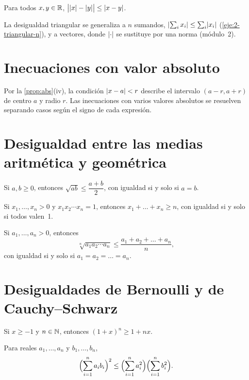 \begin{corolario}\label{cor:triangular-inversa}
Para todos $x,y\in\mathbb{R}$, $\bigl|\lvert x\rvert-\lvert y\rvert\bigr|\le\lvert x-y\rvert$.
\end{corolario}

La desigualdad triangular se generaliza a $n$ sumandos, $\lvert\sum_i x_i\rvert\le\sum_i\lvert x_i\rvert$ (\cref{eje:2-triangular-n}), y a vectores, donde $\lvert\cdot\rvert$ se sustituye por una norma (módulo~2).

\section{Inecuaciones con valor absoluto}

Por la \cref{prop:abs}(iv), la condición $\lvert x-a\rvert<r$ describe el intervalo $(a-r,a+r)$ de centro $a$ y radio $r$. Las inecuaciones con varios valores absolutos se resuelven separando casos según el signo de cada expresión.

\addtocounter{definicion}{1}%

\section{Desigualdad entre las medias aritmética y geométrica}

\begin{proposicion}\label{prop:amgm2}
Si $a,b\ge0$, entonces $\sqrt{ab}\le\dfrac{a+b}{2}$, con igualdad si y solo si $a=b$.
\end{proposicion}

\begin{lema}\label{lem:producto1}
Si $x_1,\dots,x_n>0$ y $x_1x_2\cdots x_n=1$, entonces $x_1+\dots+x_n\ge n$, con igualdad si y solo si todos valen~1.
\end{lema}

\begin{teorema}\label{teo:amgm}
Si $a_1,\dots,a_n>0$, entonces
\[
\sqrt[n]{a_1a_2\cdots a_n}\le\frac{a_1+a_2+\dots+a_n}{n},
\]
con igualdad si y solo si $a_1=a_2=\dots=a_n$.
\end{teorema}

\addtocounter{definicion}{1}%

\section{Desigualdades de Bernoulli y de Cauchy--Schwarz}

\begin{teorema}\label{teo:bernoulli}
Si $x\ge-1$ y $n\in\mathbb{N}$, entonces $(1+x)^n\ge1+nx$.
\end{teorema}

\begin{teorema}\label{teo:cs}
Para reales $a_1,\dots,a_n$ y $b_1,\dots,b_n$,
\[
\Bigl(\sum_{i=1}^na_ib_i\Bigr)^2\le\Bigl(\sum_{i=1}^na_i^2\Bigr)\Bigl(\sum_{i=1}^nb_i^2\Bigr).
\]
\end{teorema}

\addtocounter{definicion}{1}%

\addtocounter{definicion}{1}%

